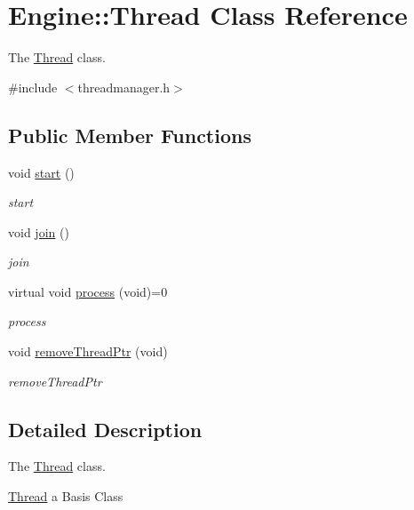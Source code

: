 \hypertarget{classEngine_1_1Thread}{}\section{Engine\+:\+:Thread Class Reference}
\label{classEngine_1_1Thread}


The \hyperlink{classEngine_1_1Thread}{Thread} class.  




{\ttfamily \#include $<$threadmanager.\+h$>$}

\subsection*{Public Member Functions}
\begin{DoxyCompactItemize}
\item 
void \hyperlink{classEngine_1_1Thread_a1f53ee62bd30a7924186ef26150ce262}{start} ()
\begin{DoxyCompactList}\small\item\em start \end{DoxyCompactList}\item 
void \hyperlink{classEngine_1_1Thread_a4d9d788e98388a3217831a9046709deb}{join} ()
\begin{DoxyCompactList}\small\item\em join \end{DoxyCompactList}\item 
virtual void \hyperlink{classEngine_1_1Thread_a27923d6eaf13fff1a08e0d62af70db58}{process} (void)=0
\begin{DoxyCompactList}\small\item\em process \end{DoxyCompactList}\item 
void \hyperlink{classEngine_1_1Thread_acc7bcb314637d5de9dc378572e8ba55e}{remove\+Thread\+Ptr} (void)
\begin{DoxyCompactList}\small\item\em remove\+Thread\+Ptr \end{DoxyCompactList}\end{DoxyCompactItemize}


\subsection{Detailed Description}
The \hyperlink{classEngine_1_1Thread}{Thread} class. 

\hyperlink{classEngine_1_1Thread}{Thread} a Basis Class 


